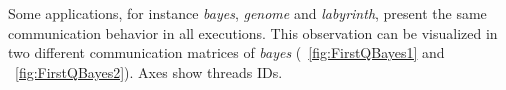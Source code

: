 Some applications, for instance \emph{bayes}, \emph{genome} and \emph{labyrinth}, present the same communication behavior in all executions. This observation can be visualized in two different communication matrices of \emph{bayes} (\figurename~\ref{fig:FirstQBayes1} and \figurename~\ref{fig:FirstQBayes2}). Axes show threads IDs.
\begin{figure}[!t]
	\centering
\end{figure}
